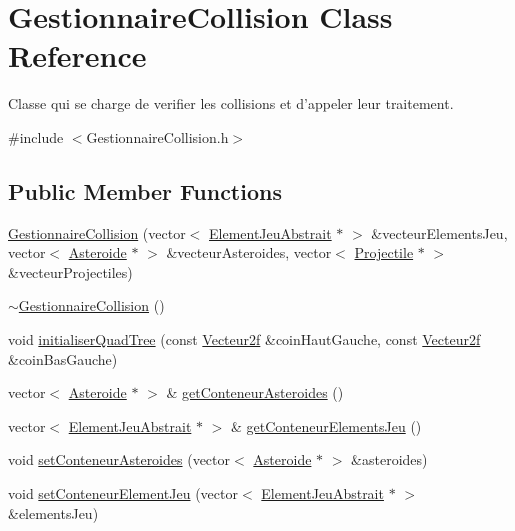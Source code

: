 \hypertarget{class_gestionnaire_collision}{\section{Gestionnaire\-Collision Class Reference}
\label{class_gestionnaire_collision}
}


Classe qui se charge de verifier les collisions et d'appeler leur traitement.  




{\ttfamily \#include $<$Gestionnaire\-Collision.\-h$>$}

\subsection*{Public Member Functions}
\begin{DoxyCompactItemize}
\item 
\hyperlink{group__inf2990_ga9df084bfa2dc4442d976654973ee5372}{Gestionnaire\-Collision} (vector$<$ \hyperlink{class_element_jeu_abstrait}{Element\-Jeu\-Abstrait} $\ast$ $>$ \&vecteur\-Elements\-Jeu, vector$<$ \hyperlink{class_asteroide}{Asteroide} $\ast$ $>$ \&vecteur\-Asteroides, vector$<$ \hyperlink{class_projectile}{Projectile} $\ast$ $>$ \&vecteur\-Projectiles)
\item 
\hyperlink{group__inf2990_ga32cdb2d1f023ff9698249fcbaa5f7dc8}{$\sim$\-Gestionnaire\-Collision} ()
\item 
void \hyperlink{group__inf2990_ga2243af30a36d7db008ec99ce8e8f74b6}{initialiser\-Quad\-Tree} (const \hyperlink{group__utilitaire_ga606b191c0b0bbb868ae25c13b906f45a}{Vecteur2f} \&coin\-Haut\-Gauche, const \hyperlink{group__utilitaire_ga606b191c0b0bbb868ae25c13b906f45a}{Vecteur2f} \&coin\-Bas\-Gauche)
\item 
vector$<$ \hyperlink{class_asteroide}{Asteroide} $\ast$ $>$ \& \hyperlink{group__inf2990_ga572a2a95fc9137f44e0a5ce8c6ab0648}{get\-Conteneur\-Asteroides} ()
\item 
vector$<$ \hyperlink{class_element_jeu_abstrait}{Element\-Jeu\-Abstrait} $\ast$ $>$ \& \hyperlink{group__inf2990_gacc26b8c32b6c1bdeb1ded2e69e427ffc}{get\-Conteneur\-Elements\-Jeu} ()
\item 
void \hyperlink{group__inf2990_ga3de2ac60f6d74d60c8015f7fba0c6194}{set\-Conteneur\-Asteroides} (vector$<$ \hyperlink{class_asteroide}{Asteroide} $\ast$ $>$ \&asteroides)
\item 
void \hyperlink{group__inf2990_ga883cc7e90d1ec884d4f983a302c9ed90}{set\-Conteneur\-Element\-Jeu} (vector$<$ \hyperlink{class_element_jeu_abstrait}{Element\-Jeu\-Abstrait} $\ast$ $>$ \&elements\-Jeu)

\end{DoxyCompactItemize}

